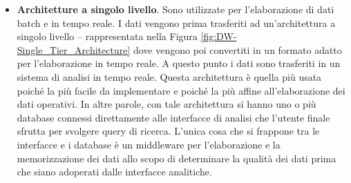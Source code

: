 \begin{itemize}
    \item \textbf{Architetture a singolo livello}. Sono utilizzate per l'elaborazione di dati batch e in tempo reale. I dati vengono prima trasferiti ad un'architettura a singolo livello -- rappresentata nella Figura \ref{fig:DW-Single_Tier_Architecture} dove vengono poi convertiti in un formato adatto per l'elaborazione in tempo reale. A questo punto i dati sono trasferiti in un sistema di analisi in tempo reale. Questa architettura è quella più usata poiché la più facile da implementare e poiché la più affine all'elaborazione dei dati operativi. In altre parole, con tale architettura si hanno uno o più database connessi direttamente alle interfacce di analisi che l'utente finale sfrutta per svolgere query di ricerca. L'unica cosa che si frappone tra le interfacce e i database è un middleware per l'elaborazione e la memorizzazione dei dati allo scopo di determinare la qualità dei dati prima che siano adoperati dalle interfacce analitiche.
    \begin{figure}[H]
    

\end{figure}
\end{itemize}

